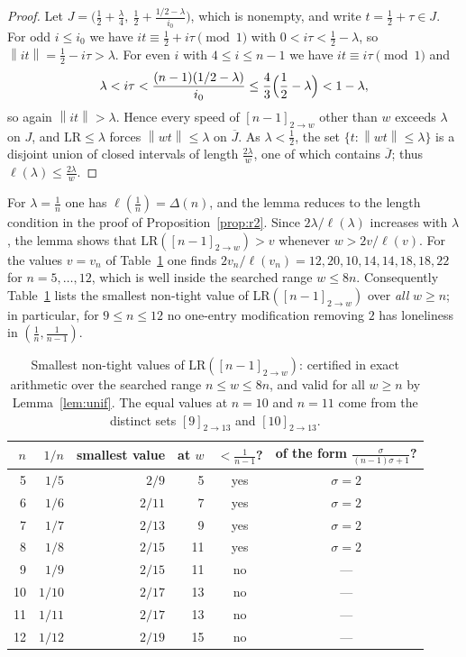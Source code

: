 \documentclass[11pt]{article}
\theoremstyle{definition}
\newcommand{\LR}{\mathrm{LR}}
\newcommand{\norm}[1]{\left\lVert #1 \right\rVert}
\begin{document}
\begin{proof}
Let $J=\bigl(\frac12+\frac\lambda4,\ \frac12+\frac{1/2-\lambda}{i_0}\bigr)$,
which is nonempty, and write $t=\frac12+\tau\in J$. For odd $i\le i_0$
we have $it\equiv\frac12+i\tau\pmod1$ with $0<i\tau<\frac12-\lambda$, so
$\norm{it}=\frac12-i\tau>\lambda$. For even $i$ with $4\le i\le n-1$ we
have $it\equiv i\tau\pmod1$ and
\[
\lambda<i\tau<\frac{(n-1)(1/2-\lambda)}{i_0}
\le\frac43\Bigl(\frac12-\lambda\Bigr)<1-\lambda ,
\]
so again $\norm{it}>\lambda$. Hence every speed of $[n-1]_{2\to w}$
other than $w$ exceeds $\lambda$ on $J$, and $\LR\le\lambda$ forces
$\norm{wt}\le\lambda$ on $\overline J$. As $\lambda<\frac12$, the set
$\{t:\norm{wt}\le\lambda\}$ is a disjoint union of closed intervals of
length $\frac{2\lambda}w$, one of which contains $\overline J$; thus
$\ell(\lambda)\le\frac{2\lambda}w$.
\end{proof}

For $\lambda=\frac1n$ one has $\ell(\frac1n)=\Delta(n)$, and the lemma
reduces to the length condition in the proof of
Proposition~\ref{prop:r2}. Since $2\lambda/\ell(\lambda)$ increases with
$\lambda$, the lemma shows that $\LR([n-1]_{2\to w})>v$ whenever
$w>2v/\ell(v)$. For the values $v=v_n$ of Table~\ref{tab:spec} one finds
$2v_n/\ell(v_n)=12,20,10,14,14,18,18,22$ for $n=5,\dots,12$, which is
well inside the searched range $w\le8n$. Consequently
Table~\ref{tab:spec} lists the smallest non-tight value of
$\LR([n-1]_{2\to w})$ over \emph{all} $w\ge n$; in particular, for
$9\le n\le12$ no one-entry modification removing $2$ has loneliness in
$(\frac1n,\frac1{n-1})$.

\begin{table}[t]
\centering
\small
\begin{tabular}{rrrrcc}
\toprule
$n$ & $1/n$ & smallest value & at $w$ & $<\frac1{n-1}$? &
of the form $\frac{\sigma}{(n-1)\sigma+1}$?\\
\midrule
5 & $1/5$ & $2/9$ & 5 & yes & $\sigma=2$\\
6 & $1/6$ & $2/11$ & 7 & yes & $\sigma=2$\\
7 & $1/7$ & $2/13$ & 9 & yes & $\sigma=2$\\
8 & $1/8$ & $2/15$ & 11 & yes & $\sigma=2$\\
9 & $1/9$ & $2/15$ & 11 & no & ---\\
10 & $1/10$ & $2/17$ & 13 & no & ---\\
11 & $1/11$ & $2/17$ & 13 & no & ---\\
12 & $1/12$ & $2/19$ & 15 & no & ---\\
\bottomrule
\end{tabular}
\caption{Smallest non-tight values of $\LR([n-1]_{2\to w})$: certified
in exact arithmetic over the searched range $n\le w\le8n$, and valid for
all $w\ge n$ by Lemma~\ref{lem:unif}. The equal values at $n=10$ and
$n=11$ come from the distinct sets $[9]_{2\to13}$ and $[10]_{2\to13}$.}
\label{tab:spec}
\end{table}
\end{document}
